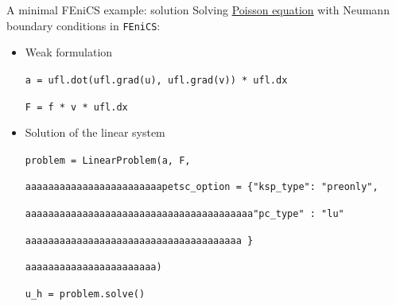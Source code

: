 \begin{frame}{A minimal FEniCS example: solution}
   \small{Solving \underline{Poisson equation} with Neumann boundary conditions in \texttt{FEniCS}:}

   \vspace{0.2cm}

   \begin{itemize}
      \item \small{Weak formulation}
      
      \begin{tcolorbox}[pythoncode]
         \footnotesize{\texttt{\textcolor{cyan!60!black}{a} = \textcolor{violet!80!black}{ufl}.\textcolor{green!40!black}{dot}(\textcolor{violet!80!black}{ufl}.\textcolor{green!40!black}{grad}(\textcolor{cyan!60!black}{u}), \textcolor{violet!80!black}{ufl}.\textcolor{green!40!black}{grad}(\textcolor{cyan!60!black}{v})) * \textcolor{violet!80!black}{ufl}.\textcolor{green!40!black}{dx}}}

         \footnotesize{\texttt{\textcolor{cyan!60!black}{F} = \textcolor{cyan!60!black}{f} * \textcolor{cyan!60!black}{v} * \textcolor{violet!80!black}{ufl}.\textcolor{green!40!black}{dx}}}
      \end{tcolorbox}

      \item \small{Solution of the linear system}
      
      \begin{tcolorbox}[pythoncode]
         \footnotesize{\texttt{\textcolor{cyan!60!black}{problem} = \textcolor{green!40!black}{LinearProblem}(\textcolor{cyan!60!black}{a}, \textcolor{cyan!60!black}{F},}}
         
         \footnotesize{\texttt{\textcolor{gray!10}{aaaaaaaaaaaaaaaaaaaaaaaa}\textcolor{cyan!60!black}{petsc\_option} = \{\textcolor{red!80!black}{"ksp\_type"}: \textcolor{red!80!black}{"preonly"},}}
         
         \footnotesize{\texttt{\textcolor{gray!10}{aaaaaaaaaaaaaaaaaaaaaaaaaaaaaaaaaaaaaaaa}\textcolor{red!80!black}{"pc\_type"} : \textcolor{red!80!black}{"lu"}}}
         
         \footnotesize{\texttt{\textcolor{gray!10}{aaaaaaaaaaaaaaaaaaaaaaaaaaaaaaaaaaaaaa} \}}}
         
         \footnotesize{\texttt{\textcolor{gray!10}{aaaaaaaaaaaaaaaaaaaaaaa})}}

         \footnotesize{\texttt{\textcolor{cyan!60!black}{u\_h} = \textcolor{cyan!60!black}{problem}.\textcolor{green!40!black}{solve}()}}
      \end{tcolorbox}
   \end{itemize}

   \vfill
\end{frame}